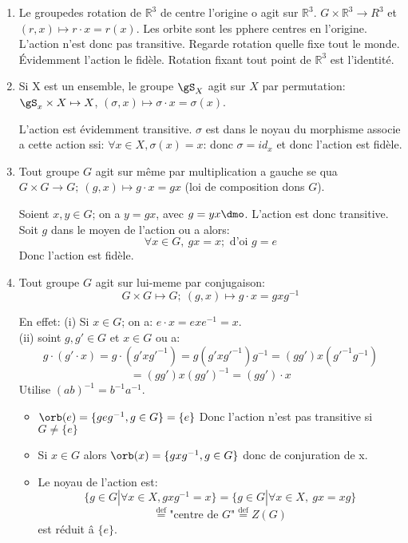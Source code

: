 \begin{examplebox}
\begin{enumerate}
	\item Le groupedes rotation de $\mathbb{R}^3$ de centre l'origine o agit sur $\mathbb{R}^3$. $G\times\mathbb{R}^3\rightarrow{R}^3$ et $(r, x)\mapsto r\cdot x=r(x).$
	Les orbite sont les pphere centres en l'origine. L'action n'est donc pas transitive. Regarde rotation quelle fixe tout le monde. Évidemment l'action le fidèle. Rotation fixant tout point de $\mathbb{R}^3$ est l'identité.
	\item Si X est un ensemble, le groupe $\gS_X$ agit sur $X$ par permutation:
	$\gS_x \times X\mapsto X$, $(\sigma, x)\mapsto \sigma\cdot x=\sigma(x)$.
	
	L'action est évidemment transitive. $\sigma$ est dans le noyau du morphisme associe a cette action ssi: $\forall x\in X, \sigma(x)=x$: donc $\sigma =id_x$ et donc l'action est fidèle.
	\item Tout groupe $G$ agit sur même par multiplication a gauche se qua $G\times G \rightarrow G;\ (g,x)\mapsto g\cdot x=gx$ (loi de composition dons $G$).
	
	Soient $x, y\in G$; on a $y=gx$, avec $g=yx\dmo$. L'action est donc transitive.
	Soit $g$ dans le moyen de l'action ou a alors:
	$$\forall x\in G,\ gx=x; \mbox{ d'oi } g=e$$
	Donc l'action est fidèle.
	\item Tout groupe $G$ agit sur lui-meme par conjugaison:
	$$G\times G\mapsto G;\ (g,x)\mapsto g\cdot x=gxg^{-1}$$
	
	En effet: (i) Si $x\in G$; on a: $e\cdot x = exe^{-1} = x$.\\
	(ii)  soint $g, g'\in G$ et $x\in G$ ou a:
	$$g\cdot (g'\cdot x)=g\cdot (g'xg'^{-1})=g(g'xg'^{-1})g^{-1}=(gg')x(g'^{-1}g^{-1})$$
	$$=(gg')x(gg')^{-1}=(gg')\cdot x$$
	Utilise $(ab)^{-1}=b^{-1}a^{-1}$.
	\begin{itemize} 
	\item $\orb(e)=\{geg^{-1}, g\in G\}=\{e\}$ Donc l'action n'est pas transitive si $G \neq\{e\}$ \\%
	\item Si $x\in G$ alors $\orb(x)=\{gxg^{-1}, g\in G\}$ donc de conjuration de x.\\
	\item Le noyau de l'action est:	
	$$\{g\in G | \forall x\in X, gxg^{-1} = x\} = \{g\in G | \forall x \in X,\ gx=xg\}$$
	$$\overset{\text{def}}{=}\text{"centre de $G$"}\overset{\text{def}}{=} Z(G)$$
	est réduit â $\{e\}$.
	\end{itemize}
\end{enumerate}
\end{examplebox}

